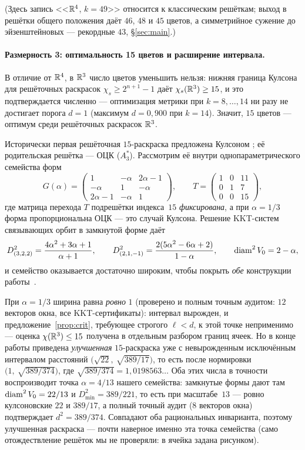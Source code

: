 (Здесь запись <<$\mathbb{R}^4$, $k=49$>> относится к классическим решёткам; выход в
решётки общего положения даёт $46$, $48$ и $45$ цветов, а симметрийное сужение
до эйзенштейновых --- рекордные $43$, \S\ref{sec:main}.)

\paragraph{Размерность 3: оптимальность 15 цветов и расширение интервала.}
В отличие от $\mathbb{R}^4$, в $\mathbb{R}^3$ число цветов уменьшить нельзя: нижняя граница
Кулсона для решёточных раскрасок $\chi_s\ge2^{n+1}-1$ \cite{Coulson,ABPR} даёт
$\chi_s(\mathbb{R}^3)\ge15$, и это подтверждается численно --- оптимизация метрики при
$k=8,\dots,14$ ни разу не достигает порога $d=1$ (максимум $d=0{,}900$ при
$k=14$). Значит, $15$ цветов --- оптимум среди решёточных раскрасок $\mathbb{R}^3$.

Исторически первая решёточная $15$-раскраска предложена Кулсоном
\cite{Coulson}; её родительская решётка --- ОЦК ($A_3^*$). Рассмотрим её
внутри однопараметрического семейства форм
\[
G(\alpha)=\begin{pmatrix}1&-\alpha&2\alpha-1\\-\alpha&1&-\alpha\\
2\alpha-1&-\alpha&1\end{pmatrix},
\qquad
T=\begin{pmatrix}1&0&11\\0&1&7\\0&0&15\end{pmatrix},
\]
где матрица перехода $T$ подрешётки индекса~$15$ \emph{фиксирована}, а при
$\alpha=1/3$ форма пропорциональна ОЦК --- это случай Кулсона. Решение
KKT-систем связывающих орбит в замкнутой форме даёт
\[
D^2_{(3,2,2)}=\frac{4\alpha^2+3\alpha+1}{\alpha+1},\qquad
D^2_{(2,1,-1)}=\frac{2(5\alpha^2-6\alpha+2)}{1-\alpha},\qquad
\operatorname{diam}^2 V_0=2-\alpha,
\]
и семейство оказывается достаточно широким, чтобы покрыть \emph{обе}
конструкции работы~\cite{Coulson}.

При $\alpha=1/3$ ширина равна \emph{ровно} $1$ (проверено и полным точным
аудитом: $12$ векторов окна, все KKT-сертификаты): интервал вырожден, и
предложение~\ref{prop:crit}, требующее строгого $\ell<d$, к этой точке
неприменимо --- оценка $\chi(\mathbb{R}^3)\le15$ получена в \cite{Coulson} отдельным
разбором границ ячеек. Но в конце работы \cite{Coulson} приведена
\emph{улучшенная} $15$-раскраска уже с невырожденным исключённым интервалом
расстояний $\bigl(\sqrt{22},\ \sqrt{389/17}\bigr)$, то есть после нормировки
$\bigl(1,\ \sqrt{389/374}\bigr)$, где
$\sqrt{389/374}=1{,}0198563\ldots$ Оба этих числа в точности воспроизводит
точка $\alpha=4/13$ нашего семейства: замкнутые формы дают там
$\operatorname{diam}^2 V_0=22/13$ и $D^2_{\min}=389/221$, то есть при масштабе~$13$ ---
ровно кулсоновские $22$ и $389/17$, а полный точный аудит ($8$ векторов окна)
подтверждает $d^2=389/374$. Совпадают оба рациональных инварианта, поэтому
улучшенная раскраска \cite{Coulson} --- почти наверное именно эта точка
семейства (само отождествление решёток мы не проверяли: в \cite{Coulson}
ячейка задана рисунком).

